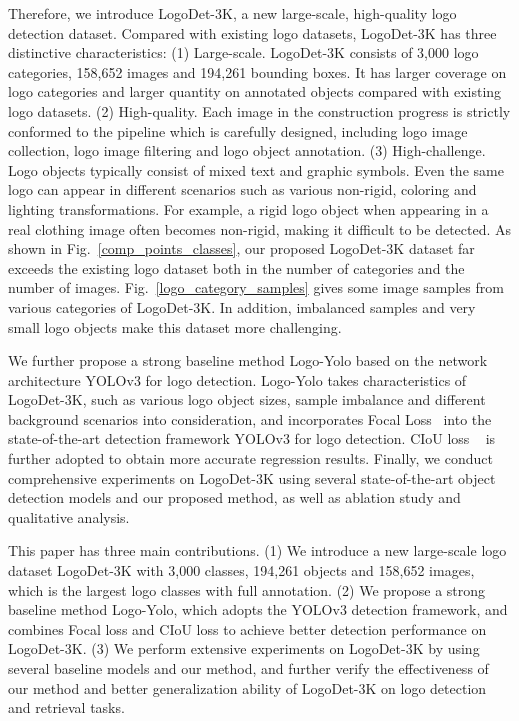 \documentclass[journal]{IEEEtran}
\begin{document}
Therefore, we introduce LogoDet-3K, a new large-scale, high-quality logo detection dataset. Compared with existing logo datasets, LogoDet-3K has three distinctive characteristics: (1) Large-scale. LogoDet-3K consists of 3,000 logo categories, 158,652 images and 194,261 bounding boxes. It has larger coverage on logo categories and larger quantity on annotated objects compared with existing logo datasets. (2) High-quality. Each image in the construction progress is strictly conformed to the pipeline which is carefully designed, including logo image collection, logo image filtering and logo object annotation. (3) High-challenge. Logo objects typically consist of mixed text and graphic symbols. Even the same logo can appear in different  scenarios such as various non-rigid, coloring and lighting transformations. For example, a rigid logo object when appearing in a real clothing image often becomes non-rigid, making it difficult to be detected. As shown in Fig.~\ref{comp_points_classes}, our proposed LogoDet-3K dataset far exceeds the existing logo dataset both in the number of categories and the number of images. Fig.~\ref{logo_category_samples} gives some image samples from various categories of LogoDet-3K. In addition, imbalanced samples and very small logo objects make this dataset more challenging.

We further propose a strong baseline method Logo-Yolo based on the network architecture YOLOv3 for logo detection. Logo-Yolo takes characteristics of LogoDet-3K, such as various logo object sizes, sample imbalance and different background scenarios into consideration, and incorporates Focal Loss~\cite{Tsung2017Focal} into the state-of-the-art detection framework YOLOv3 for logo detection. CIoU loss ~\cite{Zheng2020Distance} is further adopted to obtain more accurate regression results. Finally, we conduct comprehensive experiments on LogoDet-3K using several state-of-the-art object detection models and our proposed method, as well as ablation study and qualitative analysis.

This paper has three main contributions. (1) We introduce a new large-scale logo dataset  LogoDet-3K with 3,000 classes, 194,261 objects and 158,652 images, which is the largest logo classes with full annotation.
(2) We propose a strong baseline method Logo-Yolo, which adopts the YOLOv3 detection framework, and combines Focal loss and CIoU loss to achieve better detection performance on LogoDet-3K. (3) We perform extensive experiments on LogoDet-3K by using several baseline models and our method, and further verify the effectiveness of our method and better generalization ability of LogoDet-3K on logo detection and retrieval tasks.
\end{document}

